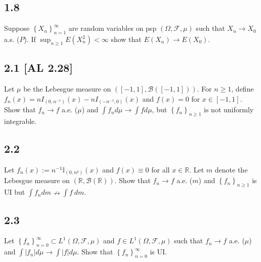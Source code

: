 \documentclass[12pt]{article}
\begin{document}
\subsection*{1.8}
\begin{tcolorbox}
Suppose $\left\{ X_{n} \right\}_{n=1}^{\infty}$ are random variables on psp $(\Omega, \mathcal{F}, \mu)$ such that $X_{n} \rightarrow X_{0}$ a.s.
($P$). If $\sup_{n\geq 1}E(X_{n}^{2}) < \infty$ show that $E(X_{n}) \rightarrow E(X_{0})$.
\end{tcolorbox}




\subsection*{2.1 [AL 2.28]}
\begin{tcolorbox}
Let $\mu$ be the Lebesgue measure on $\left( [-1,1], \mathcal{B}([-1,1]) \right)$. For $n \geq 1$, define $f_{n}(x) = nI_{(0,n^{-1})}(x) -
nI_{(-n^{-1},0)}(x)$ and $f(x) = 0$ for $x \in [-1,1]$. Show that $f_{n} \rightarrow f$ a.e. ($\mu$) and $\int f_{n}d\mu \rightarrow \int fd\mu$, but
$\left\{ f_{n} \right\}_{n\geq 1}$ is not uniformly integrable.
\end{tcolorbox}



\subsection*{2.2}
\begin{tcolorbox}
Let $f_{n}(x) := n^{-1}\mathbb{I}_{(0,n^2)}(x)$ and $f(x) \equiv 0$ for all $x \in \mathbb{R}$. Let $m$ denote the Lebesgue measure on $(\mathbb{R},
\mathcal{B}(\mathbb{R}))$. Show that $f_{n} \rightarrow f$ a.e. ($m$) and $\left\{ f_{n} \right\}_{n\geq 1}$ is UI but $\int f_{n}dm \nrightarrow \int
f\ dm$.
\end{tcolorbox}



\subsection*{2.3}
\begin{tcolorbox}
Let $\left\{ f_{n} \right\}_{n=0}^{\infty} \subset L^{1}(\Omega, \mathcal{F}, \mu)$ and $f \in L^{1}(\Omega, \mathcal{F}, \mu)$ such that $f_{n}
\rightarrow f$ a.e. ($\mu$) and $\int |f_{n}|d\mu \rightarrow \int |f|d\mu$. Show that $\left\{ f_{n} \right\}_{n=0}^{\infty}$ is UI.
\end{tcolorbox}
\end{document}
